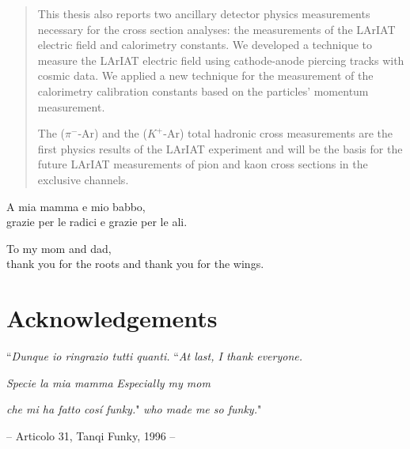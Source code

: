 \documentclass[letterpaper,12pt]{yalephd}
\newenvironment{dedication}
  {%
   \thispagestyle{empty}%
   \vspace*{\stretch{1}}%
   \itshape             %
   \raggedleft          %
  }
  {\par %
   \vspace{\stretch{3}} %
   \clearpage           %
  }
\begin{document}
\begin{abstract}
This thesis also reports two  ancillary  detector physics measurements necessary for the cross section analyses: the measurements of the LArIAT electric field and calorimetry constants. We developed a technique to measure the LArIAT electric field using cathode-anode piercing tracks with cosmic data. We applied a new technique for the measurement of the calorimetry calibration constants based on the particles' momentum measurement.


The ($\pi^-$-Ar) and the ($K^+$-Ar) total hadronic cross measurements are the first physics results of the LArIAT experiment and will be the basis for the future LArIAT measurements of pion and kaon cross sections in the exclusive channels.


\end{abstract}


\maketitle
{}

 \begin{dedication}
A mia mamma e mio babbo,\\
grazie per le radici e grazie per le ali.
    \par   %
    \vspace{2\baselineskip}
To my mom and dad,\\
thank you for the roots and thank you for the wings.
    \vspace{\baselineskip}
  \end{dedication}

\tableofcontents

\chapter{Acknowledgements} %

\noindent ``\emph{Dunque io ringrazio tutti quanti.} \hfill ``\emph{At last, I thank everyone.} 

\noindent \emph{Specie la mia mamma} \hfill \emph{Especially my mom} 

\noindent \emph{che mi ha fatto cos\'i funky.}" \hfill \emph{who made me so funky.}"

{\raggedleft -- Articolo 31, Tanqi Funky, 1996 -- \par}
\vspace{0.5cm}
\end{document}
